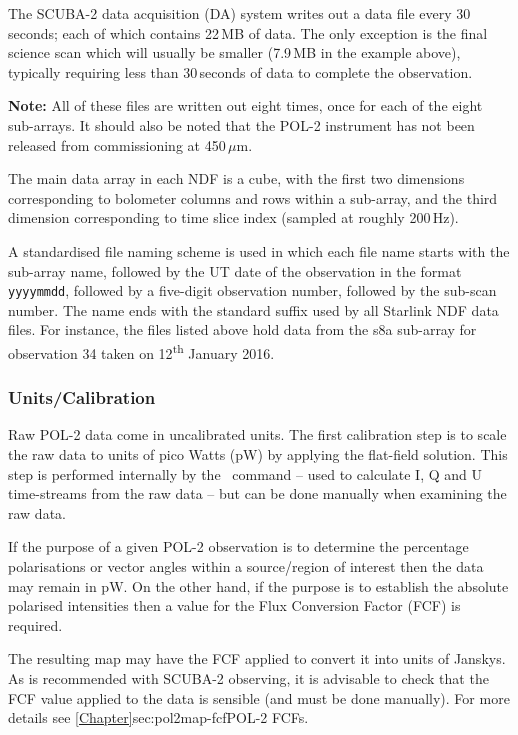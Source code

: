 The SCUBA-2 data acquisition (DA) system writes out a data file every
30\,seconds; each of which contains 22\,MB of data. The only exception
is the final science scan which will usually be smaller (7.9\,MB in
the example above), typically requiring less than 30\,seconds of data
to complete the observation.

\textbf{Note:} All of these files are written out eight times, once
for each of the eight sub-arrays. It should also be noted that the
POL-2 instrument has not been released from commissioning at 450\,$\mu$m.

The main data array in each NDF is a cube, with the first two
dimensions corresponding to bolometer columns and rows within a
sub-array, and the third dimension corresponding to time slice index
(sampled at roughly 200\,Hz).

A standardised file naming scheme is used in which each file name
starts with the sub-array name, followed by the UT date of the
observation in the format \texttt{yyyymmdd}, followed by a five-digit
observation number, followed by the sub-scan number. The name ends
with the standard suffix  used by all Starlink NDF data
files. For instance, the files listed above hold data from the s8a
sub-array for observation 34 taken on 12\textsuperscript{th} January
2016.




\subsubsection*{Units/Calibration}

Raw POL-2 data come in uncalibrated units. The first calibration step
is to scale the raw data to units of pico Watts (pW) by applying the
flat-field solution. This step is performed internally by the \SMURF\
command  -- used to calculate
I, Q and U time-streams from the
raw data -- but can be done manually when examining the raw data.

If the purpose of a given POL-2 observation is to determine the
percentage polarisations or vector angles within a source/region of
interest then the data may remain in pW. On the other hand, if the
purpose is to establish the absolute polarised intensities then a
value for the Flux Conversion Factor (FCF) is required.

The resulting map may have the FCF applied to convert it into units of
Janskys. As is recommended with SCUBA-2 observing, it is advisable to
check that the FCF value applied to the data is sensible (and must be
done manually). For more details see
\cref{Chapter}{sec:pol2map-fcf}{POL-2 FCFs}.





